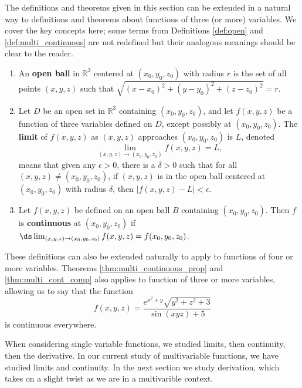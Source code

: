 The definitions and theorems given in this section can be extended in a natural way to definitions and theorems about functions of three (or more) variables. We cover the key concepts here; some terms from Definitions \ref{def:open} and \ref{def:multi_continuous} are not redefined but their analogous meanings should be clear to the reader.

\setboxwidth{20pt}
{\begin{enumerate}
\item An \textbf{open ball} in $\mathbb{R}^3$ centered at $(x_0,y_0,z_0)$ with radius $r$ is the set of all points $(x,y,z)$ such that $\sqrt{(x-x_0)^2+(y-y_0)^2+(z-z_0)^2} = r$.
\\

\item Let $D$ be an open set in $\mathbb{R}^3$ containing $(x_0,y_0,z_0)$, and let $f(x,y,z)$ be a function of three variables defined on $D$, except possibly at  $(x_0,y_0,z_0)$. The \textbf{limit} of $f(x,y,z)$ as $(x,y,z)$ approaches $(x_0,y_0,z_0)$ is $L$, denoted 
$$\lim_{(x,y,z)\to (x_0,y_0,z_0)} f(x,y,z) = L,$$
means that given any $\epsilon >0$, there is a $\delta >0$ such that for all  $(x,y,z)\neq(x_0,y_0,z_0)$, if $(x,y,z)$ is in the open ball centered at $(x_0,y_0,z_0)$ with radius $\delta$, then $|f(x,y,z) - L|< \epsilon$.\\

\item Let $f(x,y,z)$ be defined on an open ball $B$ containing $(x_0,y_0,z_0)$. Then $f$ is \textbf{continuous} at $(x_0,y_0,z_0)$ if $\ds \lim_{(x,y,z)\to (x_0,y_0,z_0)} f(x,y,z) = f(x_0,y_0,z_0)$.
\end{enumerate}}

These definitions can also be extended naturally to apply to functions of four or more variables. Theorems \ref{thm:multi_continuous_prop} and \ref{thm:multi_cont_comp} also applies to function of three or more variables, allowing us to say that the function
\[f(x,y,z) = \frac{e^{x^2+y}\sqrt{y^2+z^2+3}}{\sin (xyz)+5}\]
is continuous everywhere.

When considering single variable functions, we studied limits, then continuity, then the derivative. In our current study of multivariable functions, we have studied limits and continuity. In the next section we study derivation, which takes on a slight twist as we are in a multivarible context.

